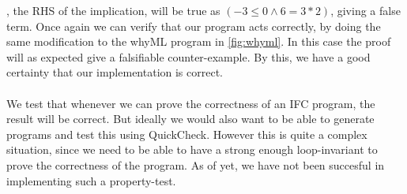 , the RHS of the implication, will be true as
$(-3 \leq 0 \land 6 = 3 * 2)$, giving a false term.
Once again we can verify that our program acts correctly, by doing the same modification to the whyML program in \autoref{fig:whyml}. In this case the proof will as expected give a falsifiable counter-example. By this, we have a good certainty that our implementation is correct.
\\~\\
We test that whenever we can prove the correctness of an IFC program, the result will be correct. But ideally we would also want to be able to generate programs and test this using QuickCheck. However this is quite a complex situation, since we need to be able to have a strong enough loop-invariant to prove the correctness of the program. As of yet, we have not been succesful in implementing such a property-test.
